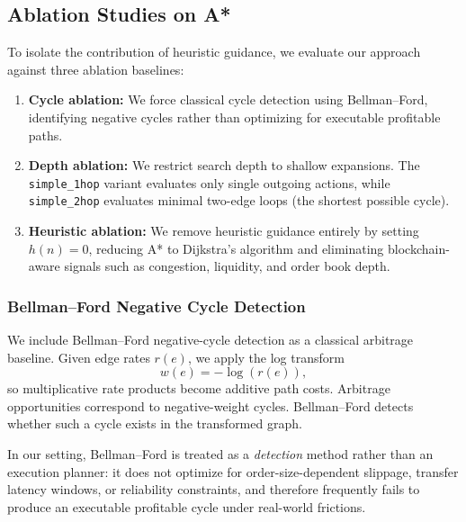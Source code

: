 \subsection{Ablation Studies on A*}

To isolate the contribution of heuristic guidance, we evaluate our approach against three ablation baselines:

\begin{enumerate}
    \item \textbf{Cycle ablation:} We force classical cycle detection using Bellman--Ford, identifying negative cycles rather than optimizing for executable profitable paths.
    
    \item \textbf{Depth ablation:} We restrict search depth to shallow expansions. 
    The \texttt{simple\_1hop} variant evaluates only single outgoing actions, while 
    \texttt{simple\_2hop} evaluates minimal two-edge loops (the shortest possible cycle).
    
    \item \textbf{Heuristic ablation:} We remove heuristic guidance entirely by setting $h(n)=0$, reducing A* to Dijkstra’s algorithm and eliminating blockchain-aware signals such as congestion, liquidity, and order book depth.
\end{enumerate}


\subsubsection{Bellman--Ford Negative Cycle Detection}
\label{sec:bf-baseline}

We include Bellman--Ford negative-cycle detection as a classical arbitrage baseline. Given edge rates $r(e)$, we apply the log transform
\[
w(e) = -\log(r(e)),
\] %
so multiplicative rate products become additive path costs. Arbitrage opportunities correspond to negative-weight cycles. Bellman--Ford detects whether such a cycle exists in the transformed graph.

In our setting, Bellman--Ford is treated as a \emph{detection} method rather than an execution planner: it does not optimize for order-size-dependent slippage, transfer latency windows, or reliability constraints, and therefore frequently fails to produce an executable profitable cycle under real-world frictions.

